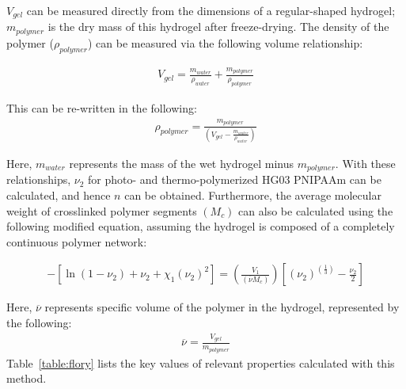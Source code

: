 $V_{gel}$ can be measured directly from the dimensions of a regular-shaped hydrogel; $m_{polymer}$ is the dry mass of this hydrogel after freeze-drying. The density of the polymer ($\rho_{polymer}$) can be measured via the following volume relationship:

\begin{align}
	V_{gel}=\frac{m_{water}}{\rho_{water}} +\frac{m_{polymer}}{\rho_{polymer}} 
\end{align}

This can be re-written in the following:
\begin{align}
	\rho_{polymer}=\frac{m_{polymer}}{(V_{gel}-\frac{m_{water}}{\rho_{water}})}
\end{align}

Here, $m_{water}$ represents the mass of the wet hydrogel minus $m_{polymer}$. With these relationships, $\nu_{2}$ for photo- and thermo-polymerized HG03 PNIPAAm can be calculated, and hence $n$ can be obtained. Furthermore, the average molecular weight of crosslinked polymer segments $(M_{c})$ can also be calculated using the following modified equation, assuming the hydrogel is composed of a completely continuous polymer network:

\begin{align}
	-[\ln⁡(1-\nu_{2} )+\nu_{2}+\chi_{1} (\nu_{2} )^{2}]=(\frac{V_{1}}{(\overline{\nu} M_{c})})[(\nu_{2} )^{(\frac{1}{3})}-\frac{\nu_{2}}{2}]
\end{align}

Here, $\overline{\nu}$ represents specific volume of the polymer in the hydrogel, represented by the following:
\begin{align}
\overline{\nu}=\frac{V_{gel}}{m_{polymer}} 
\end{align}
Table~\ref{table:flory} lists the key values of relevant properties calculated with this method.

